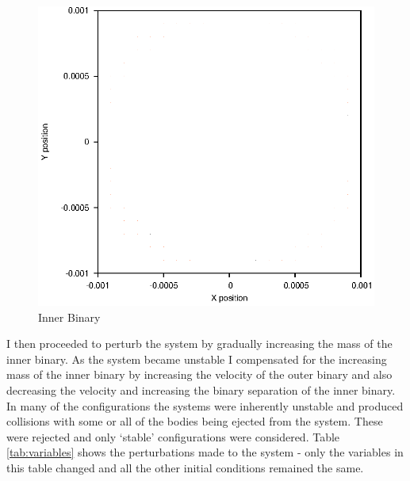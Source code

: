 \documentclass[a4paper,12pt]{article}
\begin{document}
\begin{figure}[H]
\centering
\includegraphics[width=.9\textwidth]{./2016results/innerbinary/Orbit.eps}
\caption{Inner Binary}
\label{fig:innerbinary}
\end{figure}
I then proceeded to perturb the system by gradually increasing the mass of the inner binary. As the system became unstable I compensated for
the increasing mass of the inner binary by increasing the velocity of the outer binary and also decreasing the velocity and increasing the binary 
separation of the inner binary. In many of the configurations the systems were inherently unstable and produced collisions with some 
or all of the bodies being ejected from the system. These were rejected and only `stable' configurations were considered.
Table \ref{tab:variables} shows the perturbations made to the system - only the variables in this table changed and all the other initial
conditions remained the same.
\end{document}
